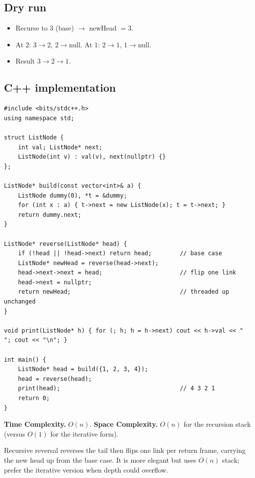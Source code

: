 \subsection*{Dry run}


\begin{itemize}
  \item Recurse to $3$ (base) $\to$ newHead $=3$.
  \item At $2$: $3\to2$, $2\to$null. At $1$: $2\to1$, $1\to$null.
  \item Result $3\to2\to1$.
\end{itemize}

\subsection*{C++ implementation}

\begin{lstlisting}
#include <bits/stdc++.h>
using namespace std;

struct ListNode {
    int val; ListNode* next;
    ListNode(int v) : val(v), next(nullptr) {}
};

ListNode* build(const vector<int>& a) {
    ListNode dummy(0), *t = &dummy;
    for (int x : a) { t->next = new ListNode(x); t = t->next; }
    return dummy.next;
}

ListNode* reverse(ListNode* head) {
    if (!head || !head->next) return head;        // base case
    ListNode* newHead = reverse(head->next);
    head->next->next = head;                      // flip one link
    head->next = nullptr;
    return newHead;                               // threaded up unchanged
}

void print(ListNode* h) { for (; h; h = h->next) cout << h->val << " "; cout << "\n"; }

int main() {
    ListNode* head = build({1, 2, 3, 4});
    head = reverse(head);
    print(head);                                  // 4 3 2 1
    return 0;
}
\end{lstlisting}

\begin{complexitybox}
\textbf{Time Complexity.} $O(n)$. \textbf{Space Complexity.} $O(n)$ for the
recursion stack (versus $O(1)$ for the iterative form).
\end{complexitybox}

\begin{takeawaybox}
Recursive reversal reverses the tail then flips one link per return frame,
carrying the new head up from the base case. It is more elegant but uses
$O(n)$ stack; prefer the iterative version when depth could overflow.
\end{takeawaybox}

